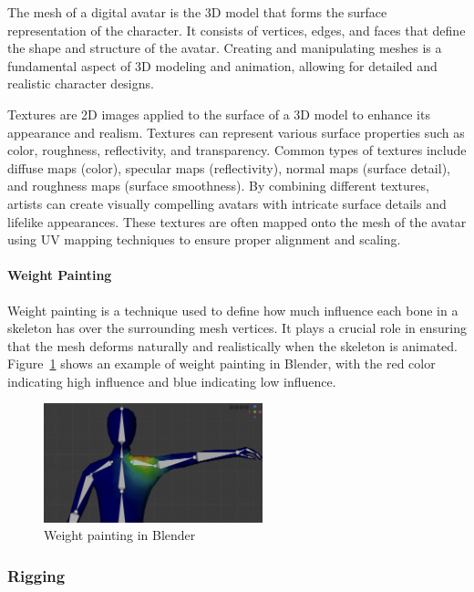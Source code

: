 \documentclass[../../main.tex]{subfiles}
\begin{document}
The mesh of a digital avatar is the 3D model that forms the surface representation of the character. It consists of vertices, edges, and faces that define the shape and structure of the avatar. Creating and manipulating meshes is a fundamental aspect of 3D modeling and animation, allowing for detailed and realistic character designs.

Textures are 2D images applied to the surface of a 3D model to enhance its appearance and realism. Textures can represent various surface properties such as color, roughness, reflectivity, and transparency. Common types of textures include diffuse maps (color), specular maps (reflectivity), normal maps (surface detail), and roughness maps (surface smoothness). By combining different textures, artists can create visually compelling avatars with intricate surface details and lifelike appearances. These textures are often mapped onto the mesh of the avatar using UV mapping techniques to ensure proper alignment and scaling.

\paragraph{Weight Painting}
\label{ch:background_work:sign_language_synthesis:3d_techniques:mesh_and_texture:weight_painting}

Weight painting is a technique used to define how much influence each bone in a skeleton has over the surrounding mesh vertices. It plays a crucial role in ensuring that the mesh deforms naturally and realistically when the skeleton is animated. Figure~\ref{fig:weight_painting} shows an example of weight painting in Blender, with the red color indicating high influence and blue indicating low influence.

\begin{figure} 
  \centering \includegraphics[width = 2.5in]{chapters/background_work/images/weight_painting.png} 
  \caption{Weight painting in Blender} 
  \label{fig:weight_painting} 
\end{figure}

\subsubsection{Rigging}
\label{ch:background_work:sign_language_synthesis:3d_techniques:rigging}
\end{document}
